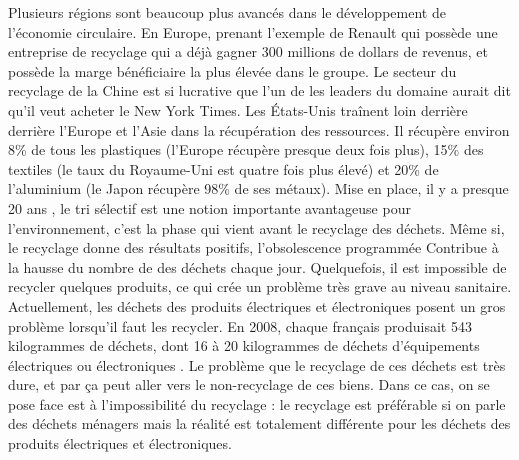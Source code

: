 Plusieurs régions sont beaucoup plus avancés dans le développement de l'économie circulaire. En Europe, prenant l'exemple de Renault qui possède une entreprise de recyclage qui a déjà gagner 300 millions de dollars de revenus, et possède la marge bénéficiaire la plus élevée dans le groupe. Le secteur du recyclage de la Chine est si lucrative que l'un de les leaders du domaine aurait dit qu'il veut acheter le New York Times. 
Les États-Unis traînent loin derrière derrière l'Europe et l'Asie dans la récupération des ressources. Il récupère environ 8\% de tous les plastiques (l'Europe récupère presque deux fois plus), 15\% des textiles (le taux du Royaume-Uni est quatre fois plus élevé) et 20\% de l'aluminium (le Japon récupère 98\% de ses métaux).
Mise en place, il y a presque 20 ans , le tri sélectif est une notion importante avantageuse pour l’environnement, c'est la phase qui vient avant le recyclage des déchets. Même si, le recyclage donne des résultats positifs, l’obsolescence programmée Contribue à la hausse du nombre de des déchets chaque jour. Quelquefois, il est impossible de recycler quelques produits, ce qui crée un problème très grave au niveau sanitaire. 
Actuellement, les déchets des produits électriques et électroniques posent un gros problème lorsqu'il faut les recycler. En 2008, chaque français produisait 543 kilogrammes de déchets, dont 16 à 20 kilogrammes de déchets d’équipements électriques ou électroniques . Le problème que le recyclage de ces déchets est très dure, et par ça peut aller vers le non-recyclage de ces biens. Dans ce cas, on se pose face est à l'impossibilité du recyclage : le recyclage est préférable si on parle des déchets ménagers mais la réalité est totalement différente pour les déchets des produits électriques et électroniques. 
